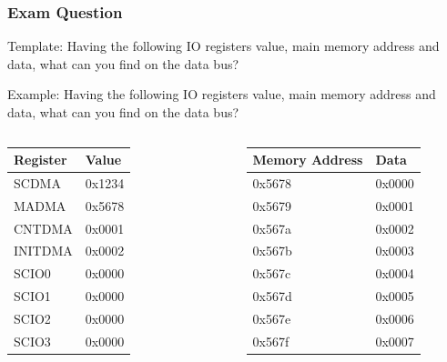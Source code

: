 \begin{frame}
    \frametitle{Exam Question}
    Template: Having the following IO registers value, main memory address and data, what can you find on the data bus?

    Example: Having the following IO registers value, main memory address and data, what can you find on the data bus?
    \begin{columns}
    \begin{table}[]
        \begin{tabular}{|l|l|}
            \hline
            \textbf{Register} & \textbf{Value} \\ \hline
            SCDMA & 0x1234 \\ \hline
            MADMA & 0x5678 \\ \hline
            CNTDMA & 0x0001 \\ \hline
            INITDMA & 0x0002 \\ \hline
            SCIO0 & 0x0000 \\ \hline
            SCIO1 & 0x0000 \\ \hline
            SCIO2 & 0x0000 \\ \hline
            SCIO3 & 0x0000 \\ \hline
        \end{tabular}
    \end{table}
    \begin{table}[]
        \begin{tabular}{|l|l|}
            \hline
            \textbf{Memory Address} & \textbf{Data} \\ \hline
            0x5678 & 0x0000 \\ \hline
            0x5679 & 0x0001 \\ \hline
            0x567a & 0x0002 \\ \hline
            0x567b & 0x0003 \\ \hline
            0x567c & 0x0004 \\ \hline
            0x567d & 0x0005 \\ \hline
            0x567e & 0x0006 \\ \hline
            0x567f & 0x0007 \\ \hline
        \end{tabular}
    \end{table}
    \end{columns}

\end{frame}
